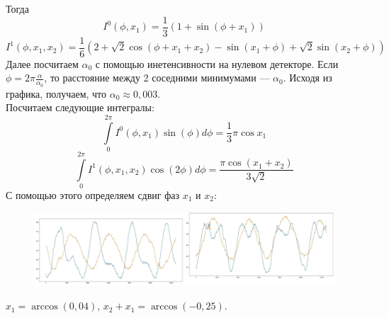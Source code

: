 \documentclass[a4paper,12pt]{article} %
\theoremstyle{definition}
\begin{document}
	Тогда 
	\begin{equation*}
		I^0(\phi, x_1) = \frac{1}{3} (1 + \sin(\phi + x_1))
	\end{equation*}
	\begin{equation*}
		I^1(\phi, x_1, x_2) = \frac{1}{6} (2 + \sqrt{2} \cos(\phi + x_1 + x_2) - \sin(x_1 + \phi) + \sqrt{2}\sin(x_2 + \phi))
	\end{equation*}
	Далее посчитаем $\alpha_0$ с помощью инетенсивности на нулевом детекторе. Если $\phi = 2\pi \frac{\alpha}{\alpha_0}$, то расстояние между 2 соседними минимумами --- $\alpha_0$. Исходя из графика, получаем, что $\alpha_0 \approx 0,003$.\\
	Посчитаем следующие интегралы:
	\begin{equation*}
		\int\limits_0^{2\pi} I^0(\phi, x_1) \sin (\phi) d\phi = \frac{1}{3} \pi \cos x_1
	\end{equation*}
	\begin{equation*}
		\int\limits_0^{2\pi} I^1(\phi, x_1, x_2) \cos (2\phi) d\phi = \frac{\pi \cos(x_1 + x_2)}{3 \sqrt{2}}
	\end{equation*}
	 С помощью этого определяем сдвиг фаз $x_1$ и $x_2$:
	 \begin{figure}[H]
	 	
	 	\includegraphics[width=\textwidth]{graph.png}
	 \end{figure}
	$x_1 = \arccos(0,04)$, $x_2 + x_1 = \arccos(-0,25)$.
\end{document}
